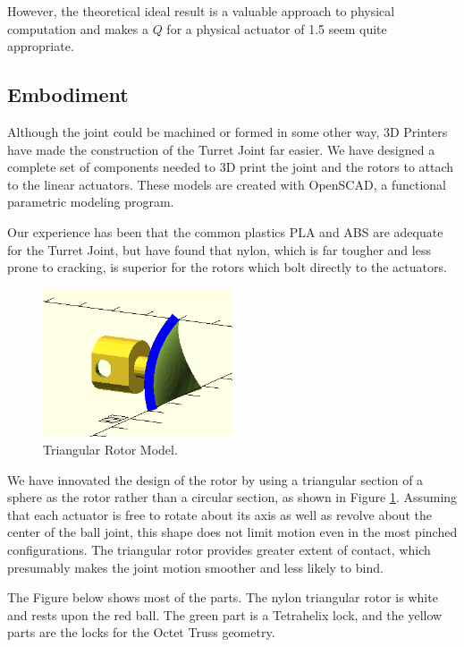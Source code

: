 \documentclass[11pt]{article}
\begin{document}
 However, the theoretical ideal result is a valuable approach to physical computation and makes a $Q$ for a physical actuator of 1.5 seem quite appropriate.

 \subsection{Embodiment}

 Although the joint could be machined or formed in some other way,
 3D Printers have made the construction of the Turret Joint far easier.
 We have designed a complete set of components needed to 3D print the joint and the rotors to attach to
 the linear actuators. These models are created with OpenSCAD, a functional parametric modeling program.

 Our experience has been that the common plastics PLA and ABS are adequate for the Turret Joint,
 but have found that nylon, which is far tougher and less prone to cracking, is superior for the
 rotors which bolt directly to the actuators.

 \begin{figure}[H]
  \centering
    \includegraphics[width=0.5\textwidth]{figures/RotorModel.png}
    \caption[Triangular Rotor Model]{Triangular Rotor Model.}
      \label{rotormodel}
\end{figure}

 We have innovated the design of the rotor by using a triangular section of a sphere as the
 rotor rather than a circular section, as shown in Figure \ref{rotormodel}.
 Assuming that each actuator is free to rotate about its axis as well as revolve about the
 center of the ball joint, this shape does not limit motion even in the most pinched
 configurations. The triangular rotor provides greater extent of contact,
 which presumably makes the joint motion
 smoother and less likely to bind.


 The Figure below shows most of the parts. The nylon triangular rotor is white and rests upon
 the red ball. The green part is a Tetrahelix lock, and the yellow parts are the locks for the Octet Truss
 geometry.
\end{document}
